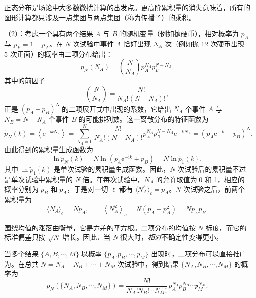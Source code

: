 正态分布是场论中大多数微扰计算的出发点。更高阶累积量的消失意味着，所有的图形计算都只涉及一点集团与两点集团（称为传播子）的乘积。

（2）：考虑一个具有两个结果 $A$ 与 $B$ 的随机变量（例如抛硬币），相对概率为 $p_A$ 与 $p_B=1-p_A$。在 $N$ 次试验中事件 $A$ 恰好出现 $N_A$ 次（例如抛 12 次硬币出现 5 次正面）的概率由二项分布给出：
\begin{equation}\label{eq:2.19}
  p_N(N_A)=\binom{N}{N_A}p_A^{N_A}p_B^{N-N_A}.
\end{equation}
其中的前因子
\begin{equation}\label{eq:2.20}
  \binom{N}{N_A}=\frac{N!}{N_A!(N-N_A)!},
\end{equation}
正是 $(p_A+p_B)^N$ 的二项展开式中出现的系数，它给出 $N_A$ 个事件 $A$ 与 $N_B=N-N_A$ 个事件 $B$ 的可能排列数。这一离散分布的特征函数为
\begin{equation}\label{eq:2.21}
  \tilde p_N(k)=\left\langle \mathrm{e}^{-\mathrm{i}kN_A}\right\rangle=\sum_{N_A=0}^{N}\frac{N!}{N_A!(N-N_A)!}p_A^{N_A}p_B^{N-N_A}\mathrm{e}^{-\mathrm{i}kN_A}=\left(p_A\mathrm{e}^{-\mathrm{i}k}+p_B\right)^N.
\end{equation}
由此得到的累积量生成函数为
\begin{equation}\label{eq:2.22}
  \ln\tilde p_N(k)=N\ln\left(p_A\mathrm{e}^{-\mathrm{i}k}+p_B\right)=N\ln\tilde p_1(k),
\end{equation}
其中 $\ln\tilde p_1(k)$ 是单次试验的累积量生成函数。因此，$N$ 次试验后的累积量不过是单次试验中累积量的 $N$ 倍。在每次试验中，$N_A$ 的允许取值为 0 和 1，相应的概率分别为 $p_B$ 和 $p_A$，于是对一切 $\ell$ 都有 $\langle N_A^{\ell}\rangle_c=p_A$。$N$ 次试验之后，前两个累积量为
\begin{equation}\label{eq:2.23}
  \langle N_A\rangle_c=Np_A,\qquad \left\langle N_A^2\right\rangle_c=N\left(p_A-p_A^2\right)=Np_Ap_B.
\end{equation}

围绕均值的涨落由衡量，它是方差的平方根。二项分布的均值按 $N$ 标度，而它的标准偏差只按 $\sqrt{N}$ 增长。因此，当 $N$ 很大时，\emph{相对}不确定性变得更小。

当多个结果 $\{A,B,\cdots,M\}$ 以概率 $\{p_A,p_B,\cdots,p_M\}$ 出现时，二项分布可以直接推广为。在总共 $N=N_A+N_B+\cdots+N_M$ 次试验中，得到结果 $\{N_A,N_B,\cdots,N_M\}$ 的概率为
\begin{equation}\label{eq:2.24}
  p_N\left(\{N_A,N_B,\cdots,N_M\}\right)=\frac{N!}{N_A!N_B!\cdots N_M!}\,p_A^{N_A}p_B^{N_B}\cdots p_M^{N_M}.
\end{equation}

